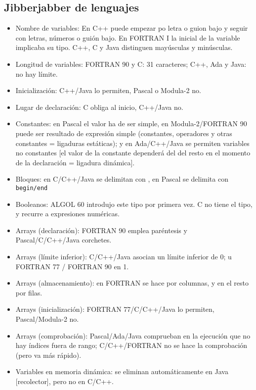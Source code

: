 \documentclass[a4paper]{article}
\begin{document}
	\subsection{Jibberjabber de lenguajes}
	\begin{itemize}
		\item Nombre de variables: En C++ puede empezar po letra o guion bajo y seguir con letras, números o guión bajo. En FORTRAN I la inicial de la variable implicaba su tipo. C++, C y Java distinguen mayúsculas y minúsculas.
		\item Longitud de variables: FORTRAN 90 y C: 31 caracteres; C++, Ada y Java: no hay límite.
		\item Inicialización: C++/Java lo permiten, Pascal o Modula-2 no. 
		\item Lugar de declaración: C obliga al inicio, C++/Java no.
		\item Constantes: en Pascal el valor ha de ser simple, en Modula-2/FORTRAN 90 puede ser resultado de expresión simple (constantes, operadores y otras constantes = ligaduras estáticas); y en Ada/C++/Java se permiten variables no constantes [el valor de la constante dependerá del del resto en el momento de la declaración = ligadura dinámica].
		\item Bloques: en C/C++/Java se delimitan con {}, en Pascal se delimita con \verb|begin/end|
		\item Booleanos: ALGOL 60 introdujo este tipo por primera vez. C no tiene el tipo, y recurre a expresiones numéricas.
		\item Arrays (declaración): FORTRAN 90 emplea paréntesis y Pascal/C/C++/Java corchetes.
		\item Arrays (límite inferior): C/C++/Java asocian un límite inferior de 0; u FORTRAN 77 / FORTRAN 90 en 1.
		\item Arrays (almacenamiento): en FORTRAN se hace por columnas, y en el resto por filas.
		\item Arrays (inicialización): FORTRAN 77/C/C++/Java lo permiten, Pascal/Modula-2 no.
		\item Arrays (comprobación): Pascal/Ada/Java comprueban en la ejecución que no hay índices fuera de rango; C/C++/FORTRAN no se hace la comprobación (pero va más rápido).
		\item Variables en memoria dinámica: se eliminan automáticamente en Java [recolector], pero no en C/C++.
	\end{itemize}
	 
	 
\end{document}
